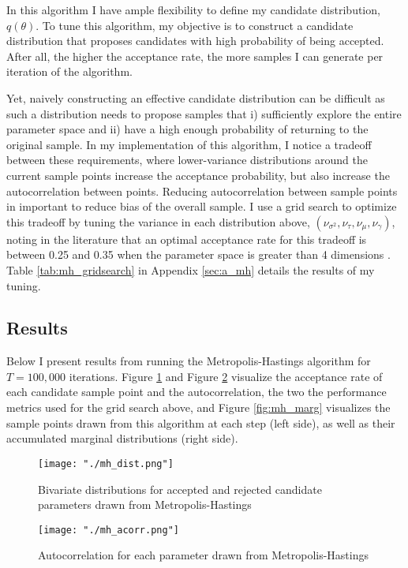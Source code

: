 \documentclass{article}
\begin{document}
In this algorithm I have ample flexibility to define my candidate distribution, $q(\theta)$. To tune this algorithm, my objective is to construct a candidate distribution that proposes candidates with high probability of being accepted. After all, the higher the acceptance rate, the more samples I can generate per iteration of the algorithm. 

Yet, naively constructing an effective candidate distribution can be difficult as such a distribution needs to propose samples that i) sufficiently explore the entire parameter space and ii) have a high enough probability of returning to the original sample. In my implementation of this algorithm, I notice a tradeoff between these requirements, where lower-variance distributions around the current sample points increase the acceptance probability, but also increase the autocorrelation between points. Reducing autocorrelation between sample points in important to reduce bias of the overall sample. I use a grid search to optimize this tradeoff by tuning the variance in each distribution above, $(\nu_{\sigma^2}, \nu_\tau, \nu_\mu, \nu_\gamma)$, noting in the literature that an optimal acceptance rate for this tradeoff is between 0.25 and 0.35 when the parameter space is greater than 4 dimensions \cite{Roberts}. Table \ref{tab:mh_gridsearch} in Appendix \ref{sec:a_mh} details the results of my tuning. 

\subsection{Results}
Below I present results from running the Metropolis-Hastings algorithm for $T=100,000$ iterations. Figure \ref{fig:mh_dist} and Figure \ref{fig:mh_acorr} visualize the acceptance rate of each candidate sample point and the autocorrelation, the two the performance metrics used for the grid search above, and Figure \ref{fig:mh_marg} visualizes the sample points drawn from this algorithm at each step (left side), as well as their accumulated marginal distributions (right side).

\begin{figure}[H]
  \centering
  \texttt{[image: "./mh\_dist.png"]}
  \caption{\label{fig:mh_dist} Bivariate distributions for accepted and rejected candidate parameters drawn from Metropolis-Hastings}
\end{figure}

\begin{figure}[H]
  \centering
  \texttt{[image: "./mh\_acorr.png"]}
  \caption{\label{fig:mh_acorr} Autocorrelation for each parameter drawn from Metropolis-Hastings}
\end{figure}
\end{document}
